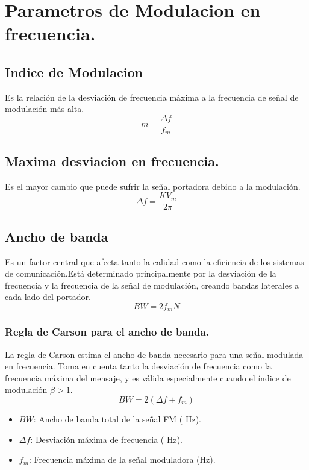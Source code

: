 \documentclass[conference]{IEEEtran}
\begin{document}
	\section{Parametros de Modulacion en frecuencia.}
	\subsection{Indice de Modulacion}
	Es la relación de la desviación de frecuencia máxima a la frecuencia de señal de modulación más alta.
	\begin{equation}
		m = \frac{\Delta f}{f_m}
		\label{eq:indice-modulacion}
	\end{equation}
	
	\subsection{Maxima desviacion en frecuencia.}
	Es el mayor cambio que puede sufrir la señal portadora  debido a la modulación.
	\begin{equation}
		\Delta f= \frac{K V_m}{2\pi}
		\label{eq:max-desviacion-frecuencia}
	\end{equation}
	
	\subsection{Ancho de banda}
	Es un factor central que afecta tanto la calidad como la eficiencia de los sistemas de comunicación.Está determinado principalmente por la desviación de la frecuencia y la frecuencia de la señal de modulación, creando bandas laterales a cada lado del portador.
	\[
	BW = {2}{f_m}{N}
	\label{eq:ancho-banda}
	\]
	\subsubsection{Regla de Carson para el ancho de banda.}
	La regla de Carson estima el ancho de banda necesario para una señal modulada en frecuencia. Toma en cuenta tanto la desviación de frecuencia como la frecuencia máxima del mensaje, y es válida especialmente cuando el índice de modulación $\beta > 1$.
	\[
	BW = 2(\Delta f + f_m)
	\]
	\begin{itemize}
		\item $BW$: Ancho de banda total de la señal FM ( Hz).
		\item $\Delta f$: Desviación máxima de frecuencia ( Hz).
		\item $f_m$: Frecuencia máxima de la señal moduladora (Hz).
	\end{itemize}
	
\end{document}

